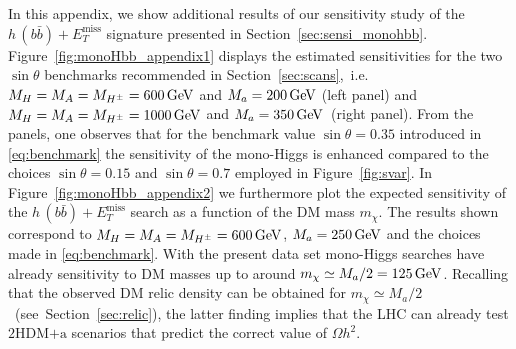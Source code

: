 \documentclass[a4paper, 11pt,notoc]{article}
\newcommand{\MET}{\ensuremath{E_T^\mathrm{miss}}\xspace}
\newcommand{\mA}{\ensuremath{M_{A}}\xspace}
\newcommand{\ma}{\ensuremath{M_{a}}\xspace}
\newcommand{\mH}{\ensuremath{M_{H}}\xspace}
\newcommand{\mHc}{\ensuremath{M_{H^{\pm}}}\xspace}
\newcommand{\hdma}{\ensuremath{\textrm{2HDM+a}}\xspace}
\begin{document}
In this appendix, we  show additional results  of our sensitivity study of the $h \, (b \bar b)+\MET$ signature presented in Section~\ref{sec:sensi_monohbb}. Figure~\ref{fig:monoHbb_appendix1} displays the estimated sensitivities for the two $\sin \theta$ benchmarks recommended in Section~\ref{sec:scans},~i.e.~$\mH = \mA = \mHc = 600 \, {\rm GeV}$ and $\ma = 200 \, {\rm GeV}$ (left panel) and $\mH = \mA = \mHc = 1000 \, {\rm GeV}$ and $\ma = 350 \, {\rm GeV}$~(right panel). From the panels, one observes that for the benchmark value $\sin \theta = 0.35$ introduced in \eqref{eq:benchmark} the sensitivity of the mono-Higgs is enhanced compared to the choices  $\sin \theta = 0.15$ and  $\sin \theta = 0.7$ employed in Figure~\ref{fig:svar}. In Figure~\ref{fig:monoHbb_appendix2} we furthermore  plot the expected sensitivity of the $h \, (b \bar b)+\MET$ search as a function of the DM mass $m_\chi$. The  results shown correspond to $\mH = \mA = \mHc = 600 \, {\rm GeV}$, $\ma = 250 \, {\rm GeV}$ and the choices made in \eqref{eq:benchmark}. With the present data set mono-Higgs searches have already sensitivity to DM masses up to around $m_\chi \simeq \ma/2 = 125 \, {\rm GeV}$. Recalling that the  observed DM relic density can be obtained for $m_\chi \simeq \ma/2$ ~(see~Section~\ref{sec:relic}), the latter finding implies that the LHC can already test  \hdma scenarios that predict the correct value of $\Omega h^2$. 

\newpage 

%
%
\end{document}
